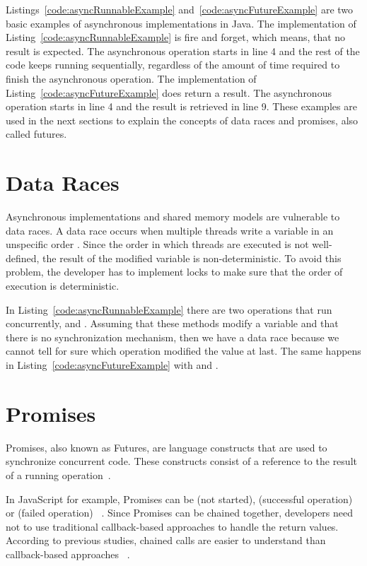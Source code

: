 \documentclass[type=bsc,accentcolor=tud9c]{tudthesis}
\newcommand{\framework}[1]{\textcolor{black!65}{#1}}
\begin{document}
Listings~\ref{code:asyncRunnableExample} and~\ref{code:asyncFutureExample} are two basic examples of asynchronous implementations in \framework{Java}. The implementation of Listing~\ref{code:asyncRunnableExample} is fire and forget, which means, that no result is expected. The asynchronous operation starts in line 4 and the rest of the code keeps running sequentially, regardless of the amount of time required to finish the asynchronous operation. The implementation of Listing~\ref{code:asyncFutureExample} does return a result. The asynchronous operation starts in line 4 and the result is retrieved in line 9. These examples are used in the next sections to explain the concepts of data races and promises, also called futures.



\section{Data Races}
Asynchronous implementations and shared memory models are vulnerable to data races. A data race occurs when multiple threads write a variable in an unspecific order \cite{bookDataRaces}. Since the order in which threads are executed is not well-defined, the result of the modified variable is non-deterministic. To avoid this problem, the developer has to implement locks to make sure that the order of execution is deterministic.

In Listing~\ref{code:asyncRunnableExample} there are two operations that run concurrently,  and . Assuming that these methods modify a variable  and that there is no synchronization mechanism, then we have a data race because we cannot tell for sure which operation modified the value at last. The same happens in Listing~\ref{code:asyncFutureExample} with  and .

\section{Promises}
Promises, also known as Futures, are language constructs that are used to synchronize concurrent code. These constructs consist of a reference to the result of a running operation~\cite{promisesDef}.

In \framework{JavaScript} for example, \framework{Promise}s can be  (not started),  (successful operation) or  (failed operation) ~\cite{promises}. Since \framework{Promise}s can be chained together, developers need not to use traditional callback-based approaches to handle the return values. According to previous studies, chained calls are easier to understand than callback-based approaches ~\cite{promisesSpring}.
\end{document}
